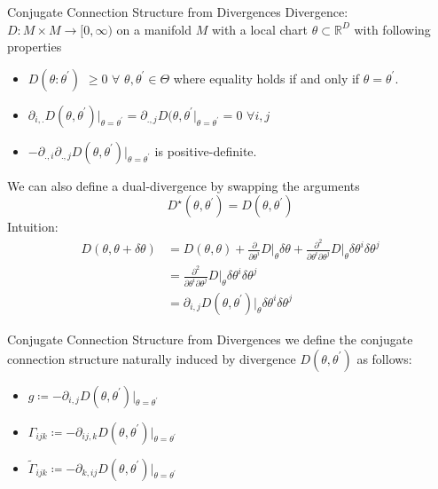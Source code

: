 \documentclass{beamer}
\begin{document}
\begin{frame}{Conjugate Connection Structure from Divergences}
Divergence: \\
$D\colon M \times M \to [0, \infty)$ on a manifold $M$ with a local chart $\theta \subset \mathbb{R}^{D}$ with following properties
\begin{itemize}
    \item $D(\theta:\theta^{\prime})$ $\geq 0$ $\forall$ $\theta, \theta^{\prime} \in \Theta$ where equality holds if and only if $\theta = \theta^{\prime}$.
    \item $\partial_{i, .}D(\theta, \theta^{\prime})\Bigr|_{\theta=\theta^{\prime}} = \partial_{., j}D(\theta, \theta^{\prime}\Bigr|_{\theta=\theta^{\prime}} = 0$ $\forall i, j$ 
    \item $-\partial_{., i}\partial_{., j}D(\theta, \theta^{\prime})\Bigr|_{\theta=\theta^{\prime}}$ is positive-definite.
\end{itemize}We can also define a dual-divergence by swapping the arguments
\begin{equation*}
    D^{\star}(\theta, \theta^{\prime}) = D(\theta, \theta^{\prime})
\end{equation*}
Intuition: 
    \begin{align*}
        D(\theta, \theta + \delta\theta) &= D(\theta, \theta) + \frac{\partial}{\partial \theta^{i}}D\Bigr|_{\theta}\delta\theta + \frac{\partial^{2}}{\partial\theta^{i}\partial\theta^{j}}D\Bigr|_{\theta}\delta\theta^{i}\delta\theta^{j} \\
                                     &= \frac{\partial^{2}}{\partial\theta^{i}\partial\theta^{j}}D\Bigr|_{\theta}\delta\theta^{i}\delta\theta^{j} \\
                                     &= \partial_{i, j}D(\theta, \theta^{\prime})\Bigr|_{\theta}\delta\theta^{i}\delta\theta^{j}
    \end{align*}
\end{frame}
\begin{frame}{Conjugate Connection Structure from Divergences}
    we define the conjugate connection structure naturally induced by divergence $D(\theta, \theta^{\prime})$ as follows:
\begin{itemize}
    \item $g\coloneqq -\partial_{i, j}D(\theta, \theta^{\prime})\Bigr|_{\theta=\theta^{\prime}}$
    \item $\Gamma_{ijk}\coloneqq -\partial_{ij, k}D(\theta, \theta^{\prime})\Bigr|_{\theta=\theta^{\prime}}$
    \item $\tilde{\Gamma}_{ijk}\coloneqq -\partial_{k, ij}D(\theta, \theta^{\prime})\Bigr|_{\theta=\theta^{\prime}}$
\end{itemize}
\end{frame}
\end{document}

